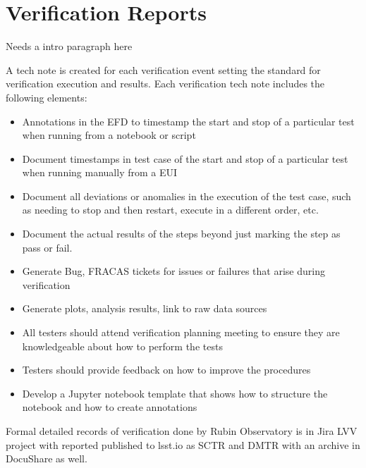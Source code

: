 \newpage
\section{Verification Reports}

Needs a intro paragraph here


A tech note is created for each verification event setting the standard for verification execution and results.  Each verification tech note includes the following elements:

\begin{itemize}

	\item Annotations in the EFD to timestamp the start and stop of a particular test when running from a notebook or script
	\item Document timestamps in test case of the start and stop of a particular test when running manually from a EUI
	\item Document all deviations or anomalies in the execution of the test case, such as needing to stop and then restart, execute in a different order, etc.
	\item Document the actual results of the steps beyond just marking the step as pass or fail.
	\item Generate Bug, FRACAS tickets for issues or failures that arise during verification
	\item Generate plots, analysis results, link to raw data sources
	\item All testers should attend verification planning meeting to ensure they are knowledgeable about how to perform the tests
	\item Testers should provide feedback on how to improve the procedures
	\item Develop a Jupyter notebook template that shows how to structure the notebook and how to create annotations
	
\end{itemize}

Formal detailed records of verification done by Rubin Observatory is in Jira LVV project with reported published to lsst.io as SCTR and DMTR with an archive in DocuShare as well.
